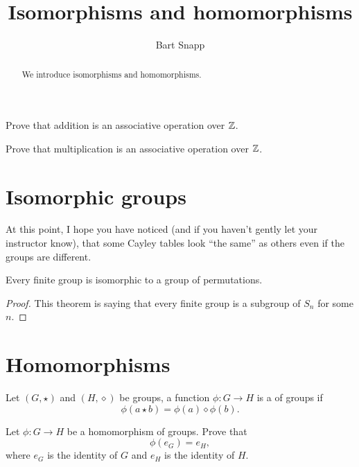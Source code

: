 \documentclass{ximera}
\author{Bart Snapp}
\title{Isomorphisms and homomorphisms}
\begin{document}
\begin{abstract}
  We introduce isomorphisms and homomorphisms.
\end{abstract}
\maketitle

\begin{exercise}
  Prove that addition is an associative operation  over $\mathbb Z$.
\end{exercise}

\begin{exercise}
  Prove that multiplication is an associative operation  over $\mathbb Z$.
\end{exercise}



\section{Isomorphic groups}

At this point, I hope you have noticed (and if you haven't gently let
your instructor know), that some Cayley tables look ``the same'' as
others even if the groups are different.



\begin{theorem}
  Every finite group is isomorphic to a group of permutations.
  \begin{proof}
    This theorem is saying that every finite group is a subgroup of
    $S_n$ for some $n$. 
  \end{proof}
\end{theorem}

\begin{corollary}
\end{corollary}


\section{Homomorphisms}

\begin{definition}
  Let $(G,\star)$ and $(H,\diamond)$ be groups, a function $\phi:G\to
  H$ is a  of groups if
  \[
  \phi(a\star b) = \phi(a)\diamond\phi(b).
  \]
\end{definition}

\begin{exercise}\label{L:HPId}
  Let $\phi:G\to H$ be a homomorphism of groups. Prove that
  \[
  \phi(e_G) = e_H,
  \]
  where $e_G$ is the identity of $G$ and $e_H$ is the identity of
  $H$.
\end{exercise}
\end{document}

